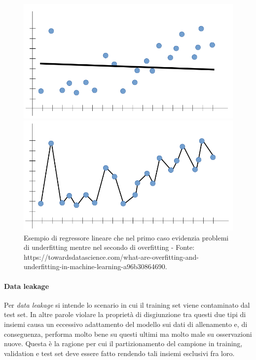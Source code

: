 \documentclass[12pt]{report}
\theoremstyle{definition}
\begin{document}
\begin{figure}
\centering
    \begin{minipage}{0.48\textwidth}
        \includegraphics[width=\linewidth]{images/underfitting.png}
    \end{minipage}
    \begin{minipage}{0.48\textwidth}
        \includegraphics[width=\linewidth]{images/overfitting.png}
    \end{minipage}
    \caption{Esempio di regressore lineare che nel primo caso evidenzia problemi di underfitting mentre nel secondo di overfitting - Fonte: https://towardsdatascience.com/what-are-overfitting-and-underfitting-in-machine-learning-a96b30864690.}
    \label{underfittingoverfitting}
\end{figure} 

\paragraph{Data leakage} Per \textit{data leakage} si intende lo scenario in cui il training set viene contaminato dal test set. In altre parole violare la proprietà di disgiunzione tra questi due tipi di insiemi causa un eccessivo adattamento del modello sui dati di allenamento e, di conseguenza, performa molto bene su questi ultimi ma molto male su osservazioni nuove.
Questa è la ragione per cui il partizionamento del campione in training, validation e test set deve essere fatto rendendo tali insiemi esclusivi fra loro.
\end{document}
